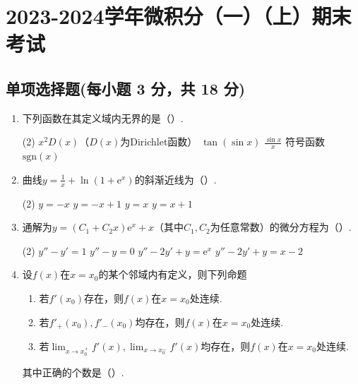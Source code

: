 \documentclass[../main.tex]{subfiles}
\begin{document}
\chapter{2023-2024学年微积分（一）（上）期末考试}

\section{单项选择题(每小题 3 分，共 18 分)}
\begin{enumerate}
    \item 下列函数在其定义域内无界的是（\qquad）.

          \begin{tasks}[label=\textbf{\Alph*.}, label-width=1.5em, column-sep=1em](2)
              \task $x^{2}D(x)$（$D(x)$为Dirichlet函数）
              \task $\tan(\sin x)$
              \task $\frac{\sin x}{x}$
              \task 符号函数$\mathrm{sgn}(x)$
          \end{tasks}

    \item 曲线$y=\frac{1}{x}+\ln\left(1+\mathrm{e}^{x}\right)$的斜渐近线为（\qquad）.

          \begin{tasks}[label=\textbf{\Alph*.}, label-width=1.5em, column-sep=1em](2)
              \task $y=-x$
              \task $y=-x+1$
              \task $y=x$
              \task $y=x+1$
          \end{tasks}

    \item 通解为$y=(C_{1}+C_{2} x)\mathrm{e}^{x}+x$（其中$C_{1},C_{2}$为任意常数）的微分方程为（\qquad）.

          \begin{tasks}[label=\textbf{\Alph*.}, label-width=1.5em, column-sep=1em](2)
              \task $y''-y'=1$
              \task $y''-y=0$
              \task $y''-2y'+y=\mathrm{e}^{x}$
              \task $y''-2y'+y=x-2$
          \end{tasks}

    \item 设$f(x)$在$x=x_{0}$的某个邻域内有定义，则下列命题
          \begin{enumerate}
              \item 若$f'(x_{0})$存在，则$f(x)$在$x=x_{0}$处连续.

              \item 若$f'_{+}(x_{0}),f'_{-}(x_{0})$均存在，则$f(x)$在$x=x_{0}$处连续.

              \item 若$\lim_{x\to x_0^+}f'(x),\lim_{x\to x_0^-}f'(x)$均存在，则$f(x)$在$x
                        =x_{0}$处连续.
          \end{enumerate}
          其中正确的个数是（\qquad）.


\end{enumerate}
\end{document}

